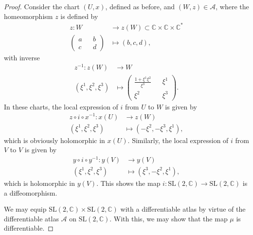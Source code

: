 \begin{proof}
    Consider the chart \((U,x)\), defined as before, and \((W, z)\in \mathscr{A}\), where the homeomorphism \(z\) is defined by
    \begin{align*}
        z : W &\to z(W) \subset \mathbb{C} \times \mathbb{C} \times \mathbb{C}^{\ast}\\
        \begin{pmatrix} a && b\\c&&d \end{pmatrix}
              &\mapsto (b,c,d),
    \end{align*}
    with inverse
    \begin{align*}
        z^{-1} : z(W) &\to W\\
        (\xi^1, \xi^2, \xi^3) &\mapsto \begin{pmatrix} \frac{1 + \xi^1\xi^2}{\xi^3} && \xi^1\\\xi^2&&\xi^3 \end{pmatrix}.
    \end{align*}
    In these charts, the local expression of \(i\) from \(U\) to \(W\) is given by
    \begin{align*}
        z \circ i \circ x^{-1} : x(U) &\to z(W)\\
        (\xi^1, \xi^2, \xi^3) &\mapsto \left(-\xi^2, -\xi^3, \xi^1\right),
    \end{align*}
    which is obviously holomorphic in \(x(U)\). Similarly, the local expression of \(i\) from \(V\) to \(V\) is given by
    \begin{align*}
        y \circ i \circ y^{-1} : y(V) &\to y(V)\\
        (\xi^1, \xi^2, \xi^3) &\mapsto \left(\xi^3,-\xi^2, \xi^1\right),
    \end{align*}
    which is holomorphic in \(y(V)\). This shows the map \(i : \mathrm{SL}(2,\mathbb{C}) \to \mathrm{SL}(2, \mathbb{C})\) is a diffeomorphism.

    We may equip \(\mathrm{SL}(2, \mathbb{C}) \times \mathrm{SL}(2, \mathbb{C})\) with a differentiable atlas by virtue of the differentiable atlas \(\mathscr{A}\) on \(\mathrm{SL}(2, \mathbb{C})\). With this, we may show that the map \(\mu\) is differentiable. \todo
\end{proof}

